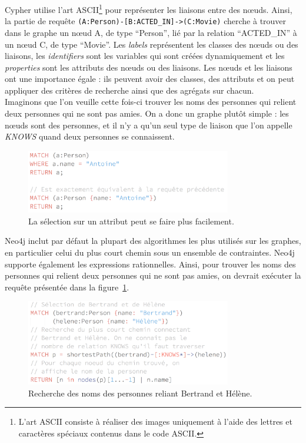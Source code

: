 		Cypher utilise l'art ASCII\footnote{L'art ASCII consiste à réaliser des images uniquement à l'aide des lettres et caractères spéciaux contenus dans le code ASCII.\cite{Wikipedia_artASCII}} pour représenter les liaisons entre des nœuds. Ainsi, la partie de requête \texttt{(A:Person)-[B:ACTED\_IN]->(C:Movie)} cherche à trouver dans le graphe un nœud A, de type \enquote{Person}, lié par la relation \enquote{ACTED\_IN} à un nœud C, de type \enquote{Movie}. Les \textit{labels} représentent les classes des nœuds ou des liaisons, les \textit{identifiers} sont les variables qui sont créées dynamiquement et les \textit{properties} sont les attributs des nœuds ou des liaisons. Les nœuds et les liaisons ont une importance égale : ils peuvent avoir des classes, des attributs et on peut appliquer des critères de recherche ainsi que des agrégats sur chacun.\\

		Imaginons que l'on veuille cette fois-ci trouver les noms des personnes qui relient deux personnes qui ne sont pas amies. On a donc un graphe plutôt simple : les nœuds sont des personnes, et il n'y a qu'un seul type de liaison que l'on appelle \textit{KNOWS} quand deux personnes se connaissent.

		\begin{figure}[H]
			\centering
			\includegraphics[width=0.8\textwidth]{images/shortSelect.png}
			\caption{La sélection sur un attribut peut se faire plus facilement.}
		\end{figure}

		Neo4j inclut par défaut la plupart des algorithmes les plus utilisés sur les graphes, en particulier celui du plus court chemin sous un ensemble de contraintes. Neo4j supporte également les expressions rationnelles. Ainsi, pour trouver les noms des personnes qui relient deux personnes qui ne sont pas amies, on devrait exécuter la requête présentée dans la figure~\ref{connectingFriends}.
		
		\begin{figure}[H]
			\centering
			\includegraphics[width=0.8\textwidth]{images/connectingFriends.png}
			\caption{Recherche des noms des personnes reliant Bertrand et Hélène.}
			\label{connectingFriends}
		\end{figure}

